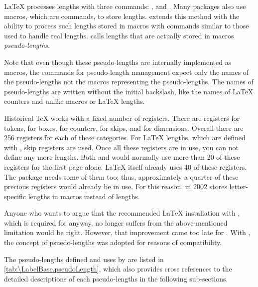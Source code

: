 \LaTeX{} processes lengths with three commands:
, 
and . Many packages also use macros,
which are commands, to store lengths. \KOMAScript{} extends this method with
the ability to process such lengths stored in macros with commands similar to
those used to handle real lengths. \KOMAScript{} calls lengths that are
actually stored in macros \emph{pseudo-lengths}.

Note that even though these pseudo-lengths are internally
implemented as macros, the commands for pseudo-length management expect only
the names of the pseudo-lengths not the macros representing the
pseudo-lengths. The names of pseudo-lengths are written without the initial
backslash, like the names of \LaTeX{} counters and unlike macros or \LaTeX{}
lengths.

\begin{Explain}
  Historical \TeX{} works with a fixed number of registers. There are
  registers for tokens, for boxes, for counters, for skips, and for
  dimensions. Overall there are 256 registers for each of these
  categories. For \LaTeX{} lengths, which are defined with ,
  skip registers are used. Once all these registers are in use, you can not
  define any more lengths. Both  and  would
  normally use more than 20 of these registers for the first page
  alone. \LaTeX{} itself already uses 40 of these registers. The
  \hyperref[cha:typearea]{}%
   package needs some of them too; thus, approximately
  a quarter of these precious registers would already be in use. For this
  reason, in 2002  stores letter-specific lengths in macros
  instead of lengths.

  Anyone who wants to argue that the recommended \LaTeX{} installation with
  \eTeX{}, which is required for \KOMAScript{} anyway, no longer suffers from
  the above-mentioned limitation would be right. However, that improvement
  came too late for . With , the concept of
  psuedo-lengths was adopted for reasons of compatibility.
\end{Explain}

The pseudo-lengths defined and uses by \KOMAScript{} are listed in
\autoref{tab:\LabelBase.pseudoLength}, which also provides cross
references to the detailed descriptions of each pseudo-lengths in the
following sub-sections.

